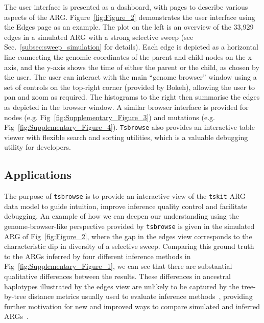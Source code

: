 \documentclass[unnumsec,webpdf,contemporary,large,namedate]{oup-authoring-template}%
\begin{document}
The user interface is presented as a dashboard, with pages to
describe various aspects of the ARG.
Figure~\ref{fig:Figure_2}
demonstrates the user interface using the Edges page as an example.
The plot on the left is an overview of the 33,929 edges
in a simulated ARG with a strong selective sweep (see
Sec.~\ref{subsec:sweep_simulation} for details).
Each edge is depicted as a horizontal line connecting the genomic coordinates
of the
parent and child nodes on the x-axis, and the y-axis shows the time of
either the parent or the child, as chosen by the user.
The user can interact with the main ``genome browser'' window
using a set of controls on the top-right corner (provided by Bokeh),
allowing the user to pan and zoom as required. The histograms to the
right then summarise the edges as depicted in the browser window.
A similar browser interface is provided for
nodes
(e.g. Fig~\ref{fig:Supplementary_Figure_3})
and mutations
(e.g. Fig~\ref{fig:Supplementary_Figure_4}).
\texttt{Tsbrowse} also provides an interactive table viewer with flexible
search and sorting utilities, which is a valuable debugging utility for
developers.


\subsection{Applications}
The purpose of \texttt{tsbrowse} is to provide an interactive view of the
\texttt{tskit} ARG data model to guide intuition, improve inference quality
control and facilitate debugging. An example of how we can deepen our understanding
using the genome-browser-like perspective provided by \texttt{tsbrowse}
is given in the simulated ARG of Fig~\ref{fig:Figure_2}, where
the gap in the edges view corresponds to the characteristic dip in diversity
of a selective sweep. Comparing this ground truth to the ARGs inferred
by four different inference methods in Fig~\ref{fig:Supplementary_Figure_1},
we can see that there are substantial qualitative differences between the
results. These differences in ancestral haplotypes illustrated by
the edges view are unlikely to be captured by the tree-by-tree distance
metrics usually used to evaluate
inference methods~\citep[e.g.][]{kelleher2019inferring,zhang2023biobank},
providing further motivation for new and improved ways to compare
simulated and inferred ARGs~\citep{fritze2024forest}.
\end{document}
